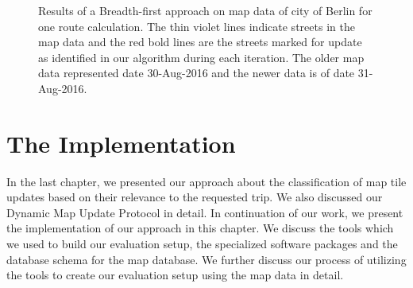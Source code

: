 \begin{figure}
\centering
\label{fg:bfsberlin}
\hspace{5mm}
\hspace{5mm}
\caption{Results of a Breadth-first approach on map data of city of Berlin for one route calculation. The thin violet lines indicate streets in the map data and the red bold lines are the streets marked for update as identified in our algorithm during each iteration. The older map data represented date 30-Aug-2016 and the newer data is of date 31-Aug-2016.}
\end{figure}



\chapter{The Implementation}\label{ch:implementation} %
In the last chapter, we presented our approach about the classification of map tile updates based on their relevance to the requested trip. We also discussed our Dynamic Map Update Protocol in detail. In continuation of our work, we present the implementation of our approach in this chapter. We discuss the tools which we used to build our evaluation setup, the specialized software packages and the database schema for the map database. We further discuss our process of utilizing the tools to create our evaluation setup using the map data in detail. 

